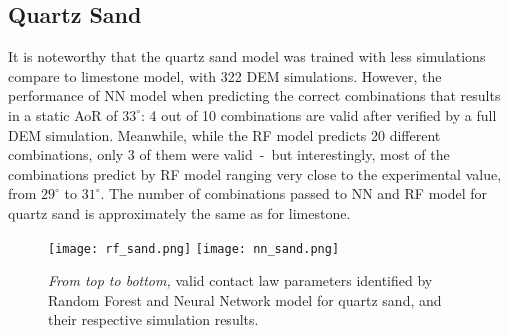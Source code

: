 \begin{table}[H]
    \centering
    \caption{Valid contact law parameters identified by the RF model for limestone and their respective simulation results.}
    \label{table:eskalRF}
\end{table}


\subsection{Quartz Sand}

It is noteworthy that the quartz sand model was trained with less simulations compare to limestone model, with 322 DEM simulations. However, the performance of NN model when predicting the correct combinations that results in a static AoR of $33^{\circ}$: 4 out of 10 combinations are valid after verified by a full DEM simulation. Meanwhile, while the RF model predicts 20 different combinations, only 3 of them were valid~-~but interestingly, most of the combinations predict by RF model ranging very close to the experimental value, from  $29^{\circ}$ to  $31^{\circ}$. The number of combinations passed to NN and RF model for quartz sand is approximately the same as for limestone. 

\begin{figure}[H]
    \centering
    \texttt{[image: rf\_sand.png]}
    \texttt{[image: nn\_sand.png]}
    \caption{\textit{From top to bottom,} valid contact law parameters identified by Random Forest and Neural Network model for quartz sand, and their respective simulation results.}\label{fig:SandNNRF}
\end{figure}

